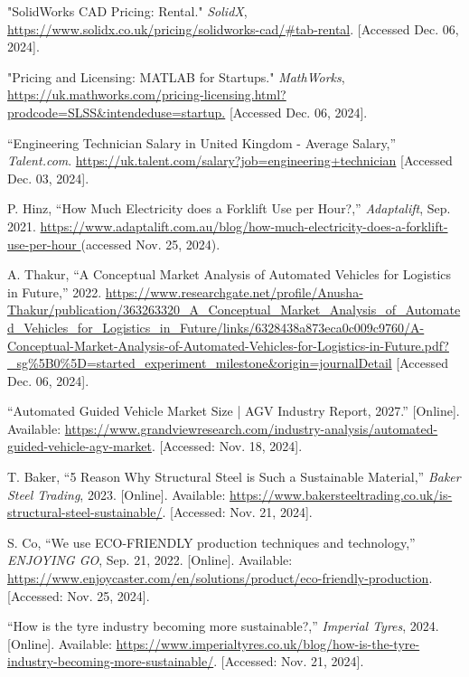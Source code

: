 \documentclass[12pt]{article}
\begin{document}
\begin{thebibliography}{99}
 "SolidWorks CAD Pricing: Rental." \textit{SolidX}, \url{https://www.solidx.co.uk/pricing/solidworks-cad/#tab-rental}. [Accessed Dec. 06, 2024].

 "Pricing and Licensing: MATLAB for Startups." \textit{MathWorks}, \url{https://uk.mathworks.com/pricing-licensing.html?prodcode=SLSS&intendeduse=startup.} [Accessed Dec. 06, 2024].

 “Engineering Technician Salary in United Kingdom - Average Salary,” \textit{Talent.com}. \url{https://uk.talent.com/salary?job=engineering+technician} [Accessed Dec. 03, 2024].

P. Hinz, “How Much Electricity does a Forklift Use per Hour?,” \textit{Adaptalift}, Sep. 2021. \url{https://www.adaptalift.com.au/blog/how-much-electricity-does-a-forklift-use-per-hour }(accessed Nov. 25, 2024).

 A. Thakur, “A Conceptual Market Analysis of Automated Vehicles for Logistics in Future,” 2022. \url{https://www.researchgate.net/profile/Anusha-Thakur/publication/363263320_A_Conceptual_Market_Analysis_of_Automated_Vehicles_for_Logistics_in_Future/links/6328438a873eca0c009c9760/A-Conceptual-Market-Analysis-of-Automated-Vehicles-for-Logistics-in-Future.pdf?_sg%5B0%5D=started_experiment_milestone&origin=journalDetail} [Accessed Dec. 06, 2024].

 “Automated Guided Vehicle Market Size | AGV Industry Report, 2027.” [Online]. Available: \url{https://www.grandviewresearch.com/industry-analysis/automated-guided-vehicle-agv-market}. [Accessed: Nov. 18, 2024].

 T. Baker, ``5 Reason Why Structural Steel is Such a Sustainable Material,'' \textit{Baker Steel Trading}, 2023. [Online]. Available: \url{https://www.bakersteeltrading.co.uk/is-structural-steel-sustainable/}. [Accessed: Nov. 21, 2024].

 S. Co, ``We use ECO-FRIENDLY production techniques and technology,'' \textit{ENJOYING GO}, Sep. 21, 2022. [Online]. Available: \url{https://www.enjoycaster.com/en/solutions/product/eco-friendly-production}. [Accessed: Nov. 25, 2024].

``How is the tyre industry becoming more sustainable?,'' \textit{Imperial Tyres}, 2024. [Online]. Available: \url{https://www.imperialtyres.co.uk/blog/how-is-the-tyre-industry-becoming-more-sustainable/}. [Accessed: Nov. 21, 2024].


\end{thebibliography}
\end{document}
